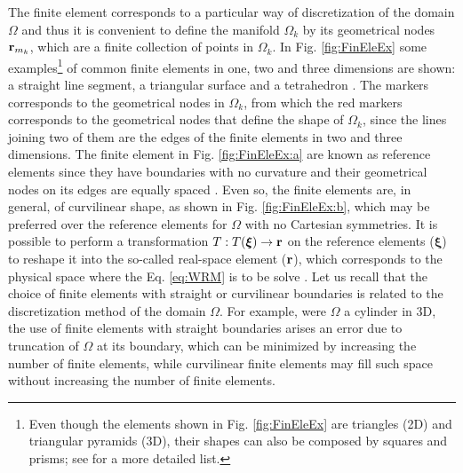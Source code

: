 The finite element corresponds to a particular way of discretization of the domain $\Omega$ and thus it is convenient to define the manifold $\Omega_k$ by its geometrical nodes $\vb{r}_{m_k}$, which are a finite collection of  points in $\Omega_k$. In Fig. \ref{fig:FinEleEx} some examples\footnote{Even though the elements shown in Fig. \ref{fig:FinEleEx} are triangles (2D) and  triangular pyramids (3D), their shapes can also be composed by squares and prisms; see \cite{dhatt_finite_2012} for a more detailed list.} of common finite elements in one, two and three dimensions are shown: a straight line segment, a triangular surface and a tetrahedron \cite{dhatt_finite_2012} . The markers corresponds to the geometrical nodes in $\Omega_k$, from which the red markers corresponds to the geometrical nodes that define the shape of $\Omega_k$, since the lines joining two of them are the edges of the finite elements in two and three dimensions. The finite element in Fig. \ref{fig:FinEleEx:a} are known as reference elements since they have boundaries with no curvature and their geometrical nodes on its edges are equally spaced \cite{dhatt_finite_2012,larson_finite_2013}.   Even so, the finite elements are, in general, of curvilinear shape, as shown in Fig. \ref{fig:FinEleEx:b},  which may be preferred over the reference elements for $\Omega$ with no Cartesian symmetries. It is possible to perform a transformation $T:T(\boldsymbol{\xi})\to\vb{r}$ on the reference elements ($\boldsymbol{\xi}$) to reshape it into the so-called real-space element ($\vb{r}$), which corresponds to the physical space where the Eq. \eqref{eq:WRM} is to be solve \cite{dhatt_finite_2012,fletcher_computational_1984}.  Let us recall that the choice of finite elements with straight or curvilinear boundaries is related to the discretization method of the domain $\Omega$. For example, were $\Omega$ a cylinder in 3D, the use of finite elements with straight boundaries arises an error due to truncation of $\Omega$ at its boundary, which can be minimized by increasing the number of finite elements, while curvilinear finite elements may fill such space without increasing the number of finite elements.

